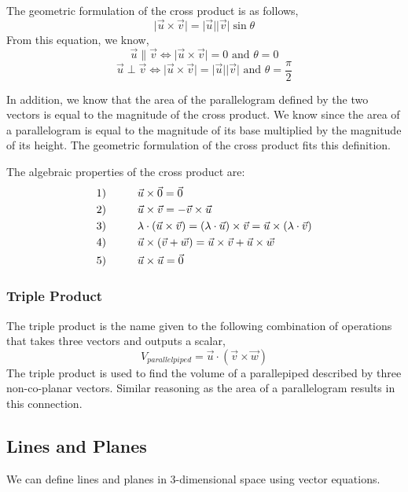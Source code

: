 \documentclass{article}
\begin{document}
The geometric formulation of the cross product is as follows,
$$\lvert \vec{u} \times \vec{v} \rvert = \lvert \vec{u} \rvert \lvert \vec{v} \rvert \sin{\theta}$$
From this equation, we know,
$$\vec{u} \parallel \vec{v} \Leftrightarrow \lvert \vec{u} \times \vec{v} \rvert = 0 \text{ and } \theta = 0$$
$$\vec{u} \perp \vec{v} \Leftrightarrow \lvert \vec{u} \times \vec{v} \rvert = \lvert \vec{u} \rvert \lvert \vec{v} \rvert \text{ and } \theta = \frac{\pi}{2}$$

In addition, we know that the area of the parallelogram defined by the two vectors is equal to the magnitude of the cross product. We know since the area of a parallelogram is equal to the magnitude of its base multiplied by the magnitude of its height. The geometric formulation of the cross product fits this definition.

The algebraic properties of the cross product are:
\begin{align*}
    &1)\hspace{1 cm} \vec{u}\times\vec{0}=\vec{0} \\
    &2)\hspace{1 cm} \vec{u}\times\vec{v}=-\vec{v}\times\vec{u} \\
    &3)\hspace{1 cm} \lambda\cdot(\vec{u}\times\vec{v})=(\lambda\cdot\vec{u})\times\vec{v}=\vec{u}\times(\lambda\cdot\vec{v})\\ 
    &4)\hspace{1 cm} \vec{u}\times(\vec{v}+\vec{w})=\vec{u}\times\vec{v}+\vec{u}\times\vec{w}\\
    &5)\hspace{1 cm} \vec{u}\times\vec{u}=\vec{0}
\end{align*}

\subsubsection{Triple Product}
The triple product is the name given to the following combination of operations that takes three vectors and outputs a scalar,
$$V_{parallelpiped} = \vec{u} \cdot (\vec{v} \times \vec{w})$$
The triple product is used to find the volume of a parallepiped described by three non-co-planar vectors. Similar reasoning as the area of a parallelogram results in this connection. 

\subsection{Lines and Planes}
We can define lines and planes in 3-dimensional space using vector equations. 
\end{document}
